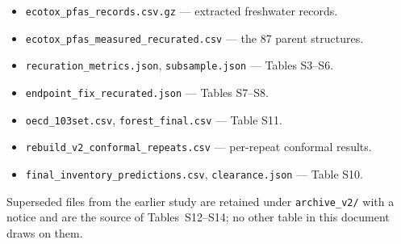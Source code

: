 \documentclass[11pt]{article}
\begin{document}
\begin{itemize}\setlength{\itemsep}{0.1em}\small
\item \texttt{ecotox\_pfas\_records.csv.gz} --- extracted freshwater records.
\item \texttt{ecotox\_pfas\_measured\_recurated.csv} --- the 87 parent structures.
\item \texttt{recuration\_metrics.json}, \texttt{subsample.json} --- Tables S3--S6.
\item \texttt{endpoint\_fix\_recurated.json} --- Tables S7--S8.
\item \texttt{oecd\_103set.csv}, \texttt{forest\_final.csv} --- Table S11.
\item \texttt{rebuild\_v2\_conformal\_repeats.csv} --- per-repeat conformal results.
\item \texttt{final\_inventory\_predictions.csv}, \texttt{clearance.json} --- Table S10.
\end{itemize}

Superseded files from the earlier study are retained under \texttt{archive\_v2/}
with a notice and are the source of Tables~S12--S14; no other table in this
document draws on them.
\end{document}
